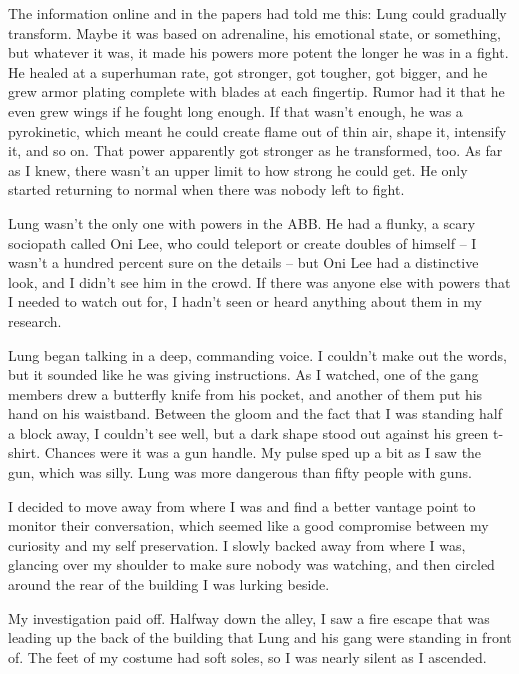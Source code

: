 The information online and in the papers had told me this: Lung could gradually transform.  Maybe it was based on adrenaline, his emotional state, or something, but whatever it was, it made his powers more potent the longer he was in a fight.  He healed at a superhuman rate, got stronger, got tougher, got bigger, and he grew armor plating complete with blades at each fingertip.  Rumor had it that he even grew wings if he fought long enough.  If that wasn't enough, he was a pyrokinetic, which meant he could create flame out of thin air, shape it, intensify it, and so on.  That power apparently got stronger as he transformed, too.  As far as I knew, there wasn't an upper limit to how strong he could get.  He only started returning to normal when there was nobody left to fight.



Lung wasn't the only one with powers in the ABB.  He had a flunky, a scary sociopath called Oni Lee, who could teleport or create doubles of himself – I wasn't a hundred percent sure on the details – but Oni Lee had a distinctive look, and I didn't see him in the crowd.  If there was anyone else with powers that I needed to watch out for, I hadn't seen or heard anything about them in my research.



Lung began talking in a deep, commanding voice.  I couldn't make out the words, but it sounded like he was giving instructions.  As I watched, one of the gang members drew a butterfly knife from his pocket, and another of them put his hand on his waistband.  Between the gloom and the fact that I was standing half a block away, I couldn't see well, but a dark shape stood out against his green t-shirt.  Chances were it was a gun handle.  My pulse sped up a bit as I saw the gun, which was silly.  Lung was more dangerous than fifty people with guns.



I decided to move away from where I was and find a better vantage point to monitor their conversation, which seemed like a good compromise between my curiosity and my self preservation.  I slowly backed away from where I was, glancing over my shoulder to make sure nobody was watching, and then circled around the rear of the building I was lurking beside.



My investigation paid off.  Halfway down the alley, I saw a fire escape that was leading up the back of the building that Lung and his gang were standing in front of.  The feet of my costume had soft soles, so I was nearly silent as I ascended.



